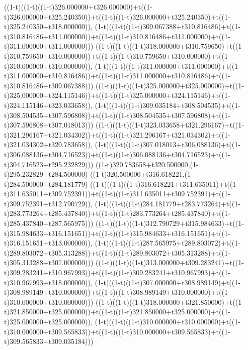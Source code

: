 ((1-t)((1-t)((1-t)326.000000+t326.000000)+t((1-t)326.000000+t325.240350))+t((1-t)((1-t)326.000000+t325.240350)+t((1-t)325.240350+t318.000000)),                                     (1-t)((1-t)((1-t)309.067388+t310.816486)+t((1-t)310.816486+t311.000000))+t((1-t)((1-t)310.816486+t311.000000)+t((1-t)311.000000+t311.000000)))
((1-t)((1-t)((1-t)318.000000+t310.759650)+t((1-t)310.759650+t310.000000))+t((1-t)((1-t)310.759650+t310.000000)+t((1-t)310.000000+t310.000000)),                                     (1-t)((1-t)((1-t)311.000000+t311.000000)+t((1-t)311.000000+t310.816486))+t((1-t)((1-t)311.000000+t310.816486)+t((1-t)310.816486+t309.067388)))
((1-t)((1-t)((1-t)325.000000+t325.000000)+t((1-t)325.000000+t324.115146))+t((1-t)((1-t)325.000000+t324.115146)+t((1-t)324.115146+t323.033658)),                                     (1-t)((1-t)((1-t)309.035184+t308.504535)+t((1-t)308.504535+t307.596808))+t((1-t)((1-t)308.504535+t307.596808)+t((1-t)307.596808+t307.018013)))
((1-t)((1-t)((1-t)323.033658+t321.296167)+t((1-t)321.296167+t321.034302))+t((1-t)((1-t)321.296167+t321.034302)+t((1-t)321.034302+t320.783658)),                                     (1-t)((1-t)((1-t)307.018013+t306.088136)+t((1-t)306.088136+t304.716523))+t((1-t)((1-t)306.088136+t304.716523)+t((1-t)304.716523+t295.232829)))
((1-t)320.783658+t320.500000,(1-t)295.232829+t284.500000)
((1-t)320.500000+t316.618221,(1-t)284.500000+t284.181779)
((1-t)((1-t)((1-t)316.618221+t311.635011)+t((1-t)311.635011+t309.752391))+t((1-t)((1-t)311.635011+t309.752391)+t((1-t)309.752391+t312.790729)),                                     (1-t)((1-t)((1-t)284.181779+t283.773264)+t((1-t)283.773264+t285.437840))+t((1-t)((1-t)283.773264+t285.437840)+t((1-t)285.437840+t287.565975)))
((1-t)((1-t)((1-t)312.790729+t315.984633)+t((1-t)315.984633+t316.151651))+t((1-t)((1-t)315.984633+t316.151651)+t((1-t)316.151651+t313.000000)),                                     (1-t)((1-t)((1-t)287.565975+t289.803072)+t((1-t)289.803072+t305.313288))+t((1-t)((1-t)289.803072+t305.313288)+t((1-t)305.313288+t307.000000)))
((1-t)((1-t)((1-t)313.000000+t309.283241)+t((1-t)309.283241+t310.967993))+t((1-t)((1-t)309.283241+t310.967993)+t((1-t)310.967993+t318.000000)),                                     (1-t)((1-t)((1-t)307.000000+t308.989149)+t((1-t)308.989149+t310.000000))+t((1-t)((1-t)308.989149+t310.000000)+t((1-t)310.000000+t310.000000)))
((1-t)((1-t)((1-t)318.000000+t321.850000)+t((1-t)321.850000+t325.000000))+t((1-t)((1-t)321.850000+t325.000000)+t((1-t)325.000000+t325.000000)),                                     (1-t)((1-t)((1-t)310.000000+t310.000000)+t((1-t)310.000000+t309.565833))+t((1-t)((1-t)310.000000+t309.565833)+t((1-t)309.565833+t309.035184)))
